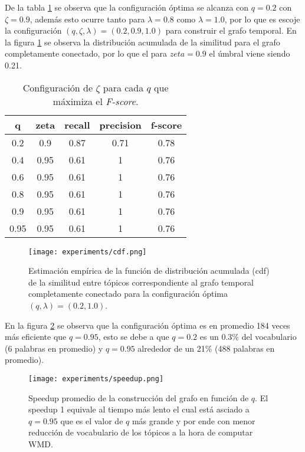 \documentclass[letterpaper,12pt,oneside]{book} %
\begin{document}
De la tabla \ref{table:f_score} se observa que la configuración óptima se alcanza con $q=0.2$ con $\zeta=0.9$, además esto ocurre tanto para $\lambda=0.8$ como $\lambda=1.0$, por lo que es escoje la configuración $(q, \zeta, \lambda) = (0.2, 0.9, 1.0)$ para construir el grafo temporal. En la figura \ref{img:cdf} se observa la distribución acumulada de la similitud para el grafo completamente conectado, por lo que el para $zeta=0.9$ el úmbral viene siendo 0.21.

\begin{table}[H]
    \begin{tabular}{|c|c|c|c|c|}
    \hline
    \textbf{q} & \textbf{zeta} & \textbf{recall} & \textbf{precision} & \textbf{f-score} \\ \hline
    0.2        & 0.9           & 0.87            & 0.71               & 0.78             \\ \hline
    0.4        & 0.95          & 0.61            & 1                  & 0.76             \\ \hline
    0.6        & 0.95          & 0.61            & 1                  & 0.76             \\ \hline
    0.8        & 0.95          & 0.61            & 1                  & 0.76             \\ \hline
    0.9        & 0.95          & 0.61            & 1                  & 0.76             \\ \hline
    0.95       & 0.95          & 0.61            & 1                  & 0.76             \\ \hline
    \end{tabular}
    \caption{Configuración de $\zeta$ para cada $q$ que máximiza el \textit{F-score}.}
    \label{table:f_score}
\end{table}


\begin{figure}
    \centering
    \texttt{[image: experiments/cdf.png]}
    \caption{Estimación empírica de la función de distribución acumulada (cdf) de la similitud entre tópicos correspondiente al grafo temporal completamente conectado para la configuración óptima $(q, \lambda)=(0.2, 1.0)$.}
    \label{img:cdf}
\end{figure}

En la figura \ref{img:speedup} se observa que la configuración óptima es en promedio 184 veces más eficiente que $q=0.95$, esto se debe a que $q=0.2$ es un 0.3\% del vocabulario (6 palabras en promedio) y $q=0.95$ alrededor de un 21\% (488 palabras en promedio).
\begin{figure}
    \centering
    \texttt{[image: experiments/speedup.png]}
    \caption{Speedup promedio de la construcción del grafo en función de $q$. El speedup 1 equivale al tiempo más lento el cual está asciado a $q=0.95$ que es el valor de $q$ más grande y por ende con menor reducción de vocabulario de los tópicos a la hora de computar WMD.}
    \label{img:speedup}
\end{figure}
\end{document}
